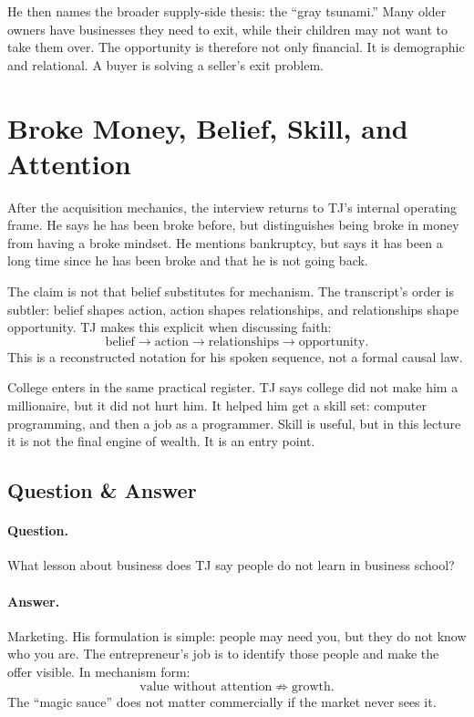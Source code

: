 He then names the broader supply-side thesis: the ``gray tsunami.'' Many older owners have businesses they need to exit, while their children may not want to take them over. The opportunity is therefore not only financial. It is demographic and relational. A buyer is solving a seller's exit problem.

\section{Broke Money, Belief, Skill, and Attention}

After the acquisition mechanics, the interview returns to TJ's internal operating frame. He says he has been broke before, but distinguishes being broke in money from having a broke mindset. He mentions bankruptcy, but says it has been a long time since he has been broke and that he is not going back.

The claim is not that belief substitutes for mechanism. The transcript's order is subtler: belief shapes action, action shapes relationships, and relationships shape opportunity. TJ makes this explicit when discussing faith:
\begin{equation}
\text{belief} \longrightarrow \text{action} \longrightarrow \text{relationships} \longrightarrow \text{opportunity}.
\end{equation}
This is a reconstructed notation for his spoken sequence, not a formal causal law.

College enters in the same practical register. TJ says college did not make him a millionaire, but it did not hurt him. It helped him get a skill set: computer programming, and then a job as a programmer. Skill is useful, but in this lecture it is not the final engine of wealth. It is an entry point.

\subsection{Question \& Answer}

\paragraph{Question.} What lesson about business does TJ say people do not learn in business school?

\paragraph{Answer.} Marketing. His formulation is simple: people may need you, but they do not know who you are. The entrepreneur's job is to identify those people and make the offer visible. In mechanism form:
\begin{equation}
\text{value without attention} \not\Rightarrow \text{growth}.
\end{equation}
The ``magic sauce'' does not matter commercially if the market never sees it.

